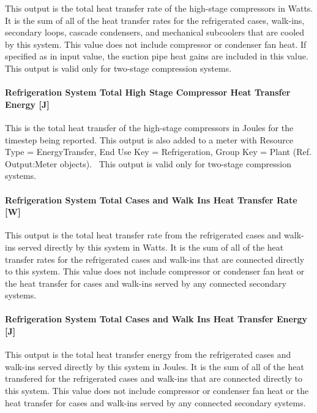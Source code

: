 This output is the total heat transfer rate of the high-stage compressors in Watts. It is the sum of all of the heat transfer rates for the refrigerated cases, walk-ins, secondary loops, cascade condensers, and mechanical subcoolers that are cooled by this system. This value does not include compressor or condenser fan heat. If specified as in input value, the suction pipe heat gains are included in this value.~ This output is valid only for two-stage compression systems.

\paragraph{Refrigeration System Total High Stage Compressor Heat Transfer Energy {[}J{]}}\label{refrigeration-system-total-high-stage-compressor-heat-transfer-energy-j}

This is the total heat transfer of the high-stage compressors in Joules for the timestep being reported. This output is also added to a meter with Resource Type = EnergyTransfer, End Use Key = Refrigeration, Group Key = Plant (Ref. Output:Meter objects).~ This output is valid only for two-stage compression systems.

\paragraph{Refrigeration System Total Cases and Walk Ins Heat Transfer Rate {[}W{]}}\label{refrigeration-system-total-cases-and-walk-ins-heat-transfer-rate-w}

This output is the total heat transfer rate from the refrigerated cases and walk-ins served directly by this system in Watts. It is the sum of all of the heat transfer rates for the refrigerated cases and walk-ins that are connected directly to this system. This value does not include compressor or condenser fan heat or the heat transfer for cases and walk-ins served by any connected secondary systems.

\paragraph{Refrigeration System Total Cases and Walk Ins Heat Transfer Energy {[}J{]}}\label{refrigeration-system-total-cases-and-walk-ins-heat-transfer-energy-j}

This output is the total heat transfer energy from the refrigerated cases and walk-ins served directly by this system in Joules. It is the sum of all of the heat transfered for the refrigerated cases and walk-ins that are connected directly to this system. This value does not include compressor or condenser fan heat or the heat transfer for cases and walk-ins served by any connected secondary systems.

